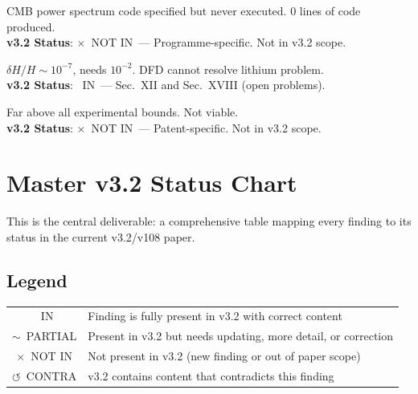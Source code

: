 \documentclass[11pt,a4paper]{article}
\newcommand{\vin}{\textcolor{statusIN}{\checkmark~IN}}
\newcommand{\vpartial}{\textcolor{statusPARTIAL}{$\sim$~PARTIAL}}
\newcommand{\vnot}{\textcolor{statusNOT}{$\times$~NOT IN}}
\newcommand{\vcontra}{\textcolor{statusCONTRA}{$\circlearrowleft$~CONTRA}}
\begin{document}
\begin{tcolorbox}[colback=negative!5,colframe=negative,title=\textbf{F76: Phase 0A --- 10 Iterations Without Execution}]
CMB power spectrum code specified but never executed. 0 lines of code produced.\\
\textbf{v3.2 Status}: \vnot\ --- Programme-specific. Not in v3.2 scope.
\end{tcolorbox}

\begin{tcolorbox}[colback=negative!5,colframe=negative,title=\textbf{F77: BBN Lithium Resolution KILLED Under Two-Component}]
$\delta H/H \sim 10^{-7}$, needs $10^{-2}$. DFD cannot resolve lithium problem.\\
\textbf{v3.2 Status}: \vin\ --- Sec.~XII and Sec.~XVIII (open problems).
\end{tcolorbox}

\begin{tcolorbox}[colback=negative!5,colframe=negative,title=\textbf{F78: Drag Reduction Requires $|\lambda-1| > 3 \times 10^{-2}$}]
Far above all experimental bounds. Not viable.\\
\textbf{v3.2 Status}: \vnot\ --- Patent-specific. Not in v3.2 scope.
\end{tcolorbox}


\section{Master v3.2 Status Chart}\label{sec:status-chart}

This is the central deliverable: a comprehensive table mapping every finding to its status in the current v3.2/v108 paper.

\subsection{Legend}

\begin{tabular}{cl}
\vin & Finding is fully present in v3.2 with correct content \\
\vpartial & Present in v3.2 but needs updating, more detail, or correction \\
\vnot & Not present in v3.2 (new finding or out of paper scope) \\
\vcontra & v3.2 contains content that contradicts this finding \\
\end{tabular}
\end{document}
